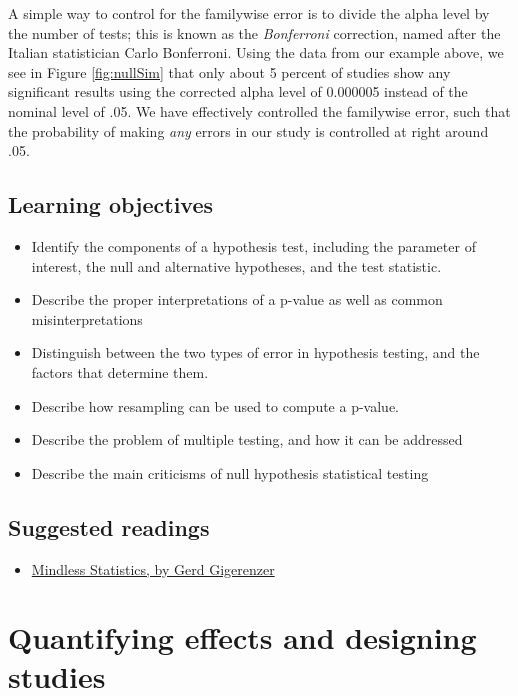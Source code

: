 \documentclass[
  12pt,
]{book}
\providecommand{\tightlist}{%
  \setlength{\itemsep}{0pt}\setlength{\parskip}{0pt}}
\begin{document}
A simple way to control for the familywise error is to divide the alpha level by the number of tests; this is known as the \emph{Bonferroni} correction, named after the Italian statistician Carlo Bonferroni. Using the data from our example above, we see in Figure \ref{fig:nullSim} that only about 5 percent of studies show any significant results using the corrected alpha level of 0.000005 instead of the nominal level of .05. We have effectively controlled the familywise error, such that the probability of making \emph{any} errors in our study is controlled at right around .05.

\hypertarget{learning-objectives-8}{%
\section{Learning objectives}\label{learning-objectives-8}}

\begin{itemize}
\tightlist
\item
  Identify the components of a hypothesis test, including the parameter of interest, the null and alternative hypotheses, and the test statistic.
\item
  Describe the proper interpretations of a p-value as well as common misinterpretations
\item
  Distinguish between the two types of error in hypothesis testing, and the factors that determine them.
\item
  Describe how resampling can be used to compute a p-value.
\item
  Describe the problem of multiple testing, and how it can be addressed
\item
  Describe the main criticisms of null hypothesis statistical testing
\end{itemize}

\hypertarget{suggested-readings-6}{%
\section{Suggested readings}\label{suggested-readings-6}}

\begin{itemize}
\tightlist
\item
  \href{https://library.mpib-berlin.mpg.de/ft/gg/GG_Mindless_2004.pdf}{Mindless Statistics, by Gerd Gigerenzer}
\end{itemize}

\hypertarget{ci-effect-size-power}{%
\chapter{Quantifying effects and designing studies}\label{ci-effect-size-power}}
\end{document}
